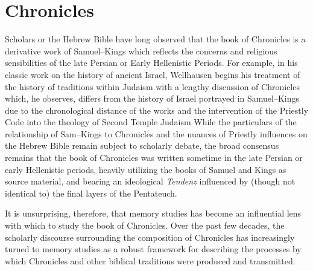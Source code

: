 \chapter{Chronicles}\label{chronicles}

Scholars or the Hebrew Bible have long observed that the book of
Chronicles is a derivative work of Samuel--Kings which reflects the
concerns and religious sensibilities of the late Persian or Early
Hellenistic Periods. For example, in his classic work on the history of
ancient Israel, Wellhausen begins his treatment of the history of
traditions within Judaism with a lengthy discussion of Chronicles which,
he observes, differs from the history of Israel portrayed in
Samuel--Kings due to the chronological distance of the works and the
intervention of the Priestly Code into the theology of Second Temple
Judaism\autocite[171--172]{wellhausen1957} While the particulars of the
relationship of Sam--Kings to Chronicles and the nuances of Priestly
influences on the Hebrew Bible remain subject to scholarly debate, the
broad consensus remains that the book of Chronicles was written sometime
in the late Persian or early Hellenistic periods, heavily utilizing the
books of Samuel and Kings as source material, and bearing an ideological
\emph{Tendenz} influenced by (though not identical to) the final layers
of the Pentateuch.\autocites[For a thorough and reasonably recent
summary of the \emph{status questionis}, see][72--89]{knoppers2003}[See
also][]{japhet1993}{japhet2009}{braun1986}[and][]{coggins1976}

It is unsurprising, therefore, that memory studies has become an
influential lens with which to study the book of Chronicles. Over the
past few decades, the scholarly discourse surrounding the composition of
Chronicles has increasingly turned to memory studies as a robust
framework for describing the processes by which Chronicles and other
biblical traditions were produced and
transmitted.\autocites{benzvi_st2017}[148--166]{wright2014}{blenkinsopp2013}{benzvi-a_evans-williams2013}{benzvi-b_evans-williams2013}
